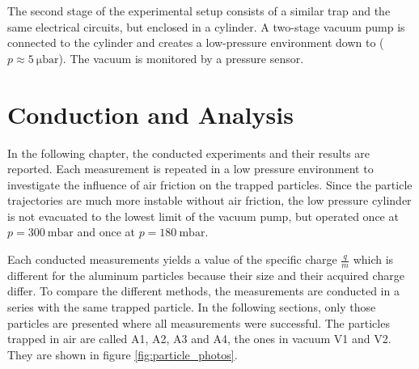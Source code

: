 \documentclass[
	paper=A4,
	parskip=full,
	chapterprefix=true,
	11pt,
	headings=normal,
	bibliography=totoc,
	listof=totoc,
	titlepage=on,
]{scrreprt}
\begin{document}
The second stage of the experimental setup consists of a similar trap and the same electrical circuits, but enclosed in a cylinder. A two-stage vacuum pump is connected to the cylinder and creates a low-pressure environment down to ($p \approx \SI{5}{\micro \bar}$). The vacuum is monitored by a pressure sensor.

\chapter{Conduction and Analysis}
\label{ch:analysis}
In the following chapter, the conducted experiments and their results are reported. Each measurement is repeated in a low pressure environment to investigate the influence of air friction on the trapped particles. Since the particle trajectories are much more instable without air friction, the low pressure cylinder is not evacuated to the lowest limit of the vacuum pump, but operated once at $p = \SI{300}{\milli \bar}$ and once at $p = \SI{180}{\milli \bar}$. 

Each conducted measurements yields a value of the specific charge $\frac{q}{m}$ which is different for the aluminum particles because their size and their acquired charge differ. To compare the different methods, the measurements are conducted in a series with the same trapped particle. In the following sections, only those particles are presented where all measurements were successful. The particles trapped in air are called A1, A2, A3 and A4, the ones in vacuum V1 and V2. They are shown in figure \ref{fig:particle_photos}.
\end{document}

